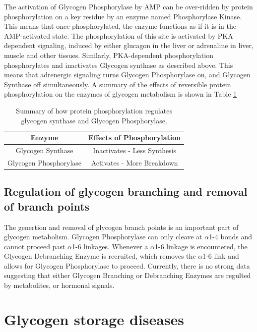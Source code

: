 \documentclass{tufte-handout}
\begin{document}
The activation of Glycogen Phosphorylase by AMP can be over-ridden by protein phosphorylation on a key residue by an enzyme named Phosphorylase Kinase.  This means that once phosphorylated, the enzyme functions as if it is in the AMP-activated state.  The phosphorylation of this site is activated by PKA dependent signaling, induced by either glucagon in the liver or adrenaline in liver, muscle and other tissues.  Similarly, PKA-dependent phosphorylation phosphorylates and inactivates Glycogen synthase as described above.  This means that adrenergic signaling turns Glycogen Phosphorylase on, and Glycogen Synthase off simultaneously.  A summary of the effects of reversible protein phosphorylation on the enzymes of glycogen metabolism is shown in Table \ref{tab:gs-gp-phosphorylation}

\begin{table}
\centering
\caption{Summary of how protein phosphorylation regulates glycogen synthase and Glycogen Phosphorylase.}
\label{tab:gs-gp-phosphorylation}
\begin{tabular}{cc}
\hline
\textbf {Enzyme} & \textbf{Effects of Phosphorylation}  \\
\hline
Glycogen Synthase & Inactivates - Less Synthesis \\
Glycogen Phosphorylase & Activates - More Breakdown\\
\hline
\end{tabular}
\end{table}

\subsection{Regulation of glycogen branching and removal of branch points}

The genertion and removal of glycogen branch points is an important part of glycogen metabolism.  Glycogen Phosphorylase can only cleave at $\alpha$1-4 bonds and cannot proceed past $\alpha$1-6 linkages.  Whenever a $\alpha$1-6 linkage is encountered, the Glycogen Debranching Enzyme is recruited, which removes the $\alpha$1-6 link and allows for Glycogen Phosphorylase to proceed.  Currently, there is no strong data suggesting that either Glycogen Branching or Debranching Enzymes are regulted by metabolites, or hormonal signals.

\section{Glycogen storage diseases}
\end{document}
